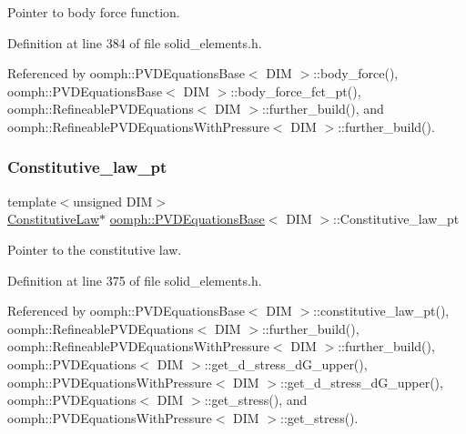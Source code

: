Pointer to body force function. 



Definition at line 384 of file solid\+\_\+elements.\+h.



Referenced by oomph\+::\+P\+V\+D\+Equations\+Base$<$ D\+I\+M $>$\+::body\+\_\+force(), oomph\+::\+P\+V\+D\+Equations\+Base$<$ D\+I\+M $>$\+::body\+\_\+force\+\_\+fct\+\_\+pt(), oomph\+::\+Refineable\+P\+V\+D\+Equations$<$ D\+I\+M $>$\+::further\+\_\+build(), and oomph\+::\+Refineable\+P\+V\+D\+Equations\+With\+Pressure$<$ D\+I\+M $>$\+::further\+\_\+build().

\mbox{\label{classoomph_1_1PVDEquationsBase_a4cdbec1d2a282493984883e0e186d393}} 
\subsubsection{\texorpdfstring{Constitutive\+\_\+law\+\_\+pt}{Constitutive\_law\_pt}}
{\footnotesize\ttfamily template$<$unsigned D\+IM$>$ \\
\hyperlink{classoomph_1_1ConstitutiveLaw}{Constitutive\+Law}$\ast$ \hyperlink{classoomph_1_1PVDEquationsBase}{oomph\+::\+P\+V\+D\+Equations\+Base}$<$ D\+IM $>$\+::Constitutive\+\_\+law\+\_\+pt\hspace{0.3cm}{\ttfamily [protected]}}



Pointer to the constitutive law. 



Definition at line 375 of file solid\+\_\+elements.\+h.



Referenced by oomph\+::\+P\+V\+D\+Equations\+Base$<$ D\+I\+M $>$\+::constitutive\+\_\+law\+\_\+pt(), oomph\+::\+Refineable\+P\+V\+D\+Equations$<$ D\+I\+M $>$\+::further\+\_\+build(), oomph\+::\+Refineable\+P\+V\+D\+Equations\+With\+Pressure$<$ D\+I\+M $>$\+::further\+\_\+build(), oomph\+::\+P\+V\+D\+Equations$<$ D\+I\+M $>$\+::get\+\_\+d\+\_\+stress\+\_\+d\+G\+\_\+upper(), oomph\+::\+P\+V\+D\+Equations\+With\+Pressure$<$ D\+I\+M $>$\+::get\+\_\+d\+\_\+stress\+\_\+d\+G\+\_\+upper(), oomph\+::\+P\+V\+D\+Equations$<$ D\+I\+M $>$\+::get\+\_\+stress(), and oomph\+::\+P\+V\+D\+Equations\+With\+Pressure$<$ D\+I\+M $>$\+::get\+\_\+stress().


